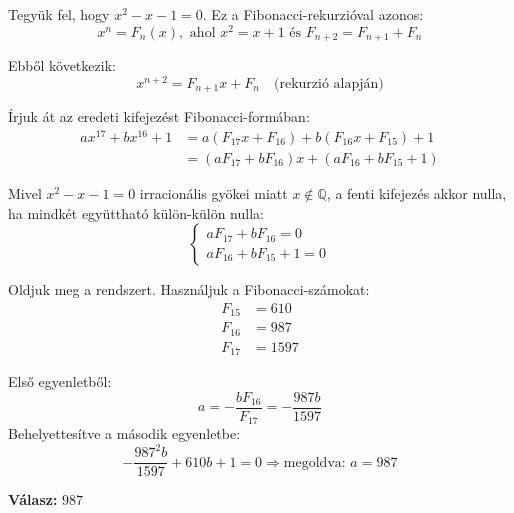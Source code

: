 \begin{solution}
Tegyük fel, hogy $x^{2}-x-1=0$. Ez a Fibonacci-rekurzióval azonos:
\[
x^{n}=F_{n}(x),\text{ ahol }x^{2}=x+1\text{ és }F_{n+2}=F_{n+1}+F_{n}
\]

Ebből következik: 
\[
x^{n+2}=F_{n+1}x+F_{n}\quad\text{(rekurzió alapján)}
\]

Írjuk át az eredeti kifejezést Fibonacci-formában: 
\begin{align*}
ax^{17}+bx^{16}+1 & =a(F_{17}x+F_{16})+b(F_{16}x+F_{15})+1\\
 & =(aF_{17}+bF_{16})x+(aF_{16}+bF_{15}+1)
\end{align*}

Mivel $x^{2}-x-1=0$ irracionális gyökei miatt $x\notin\mathbb{Q}$,
a fenti kifejezés akkor nulla, ha mindkét együttható külön-külön nulla:
\[
\begin{cases}
aF_{17}+bF_{16}=0\\
aF_{16}+bF_{15}+1=0
\end{cases}
\]

Oldjuk meg a rendszert. Használjuk a Fibonacci-számokat: 
\begin{align*}
F_{15} & =610\\
F_{16} & =987\\
F_{17} & =1597
\end{align*}

Első egyenletből: 
\[
a=-\frac{bF_{16}}{F_{17}}=-\frac{987b}{1597}
\]
Behelyettesítve a második egyenletbe: 
\[
-\frac{987^{2}b}{1597}+610b+1=0\Rightarrow\text{megoldva: }a=987
\]

\textbf{Válasz: } $\boxed{987}$
\end{solution}


